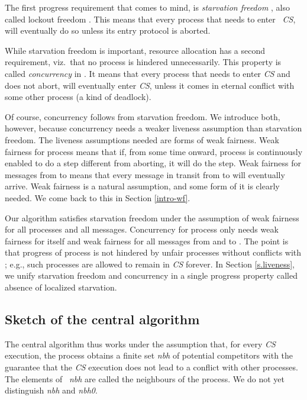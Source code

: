 \documentclass[10pt]{article} \usepackage[english]{babel}
\def\S #1/{\mbox {\textsl{#1}}}
\begin{document}
The first progress requirement that comes to mind, is \emph{starvation
  freedom} \cite{ewd651}, also called lockout freedom \cite{Lyn96}.
This means that every process that needs to enter \S
CS/, will eventually do so unless its entry protocol is aborted.

While starvation freedom is important, resource allocation has a
second requirement, viz.\ that no process is hindered unnecessarily.
This property is called \emph{concurrency} in \cite{ChM84,Rhe98}.  It
means that every process that needs to enter \S CS/ and does not
abort, will eventually enter \S CS/, unless it comes in eternal
conflict with some other process (a kind of deadlock).

Of course, concurrency follows from starvation freedom.  We introduce
both, however, because concurrency needs a weaker liveness assumption
than starvation freedom.  The liveness assumptions needed are forms of
weak fairness.  Weak fairness for process  means that if, from some
time onward, process  is continuously enabled to do a step
different from aborting, it will do the step. Weak fairness for
messages  from  to  means that every message  in transit
from  to  will eventually arrive.  Weak fairness is a natural
assumption, and some form of it is clearly needed.  We come back to
this in Section \ref{intro-wf}.

Our algorithm satisfies starvation freedom under the assumption of
weak fairness for all processes and all messages.  Concurrency for
process  only needs weak fairness for  itself and weak fairness
for all messages from and to .  The point is that progress of
process  is not hindered by unfair processes without conflicts with
; e.g., such processes are allowed to remain in \S CS/ forever.  In
Section \ref{s.liveness}, we unify starvation freedom and concurrency
in a single progress property called absence of localized starvation.

\subsection{Sketch of the central algorithm} \label{sketch}

The central algorithm thus works under the assumption that, for every
\S CS/ execution, the process obtains a finite set \S nbh/ of
potential competitors with the guarantee that the \S CS/ execution
does not lead to a conflict with other processes.  The elements of \S
nbh/ are called the neighbours of the process.  We do not yet
distinguish \S nbh/ and \S nbh0/.
\end{document}

